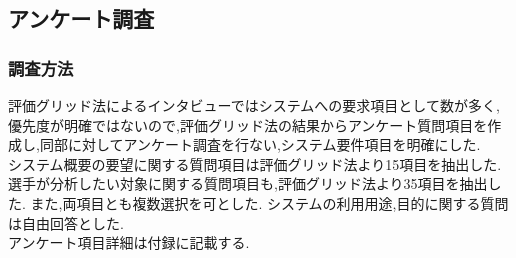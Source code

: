 \documentclass[sotsuron]{kuee}
\begin{document}
		\subsection{アンケート調査}
			\subsubsection{調査方法}
				評価グリッド法によるインタビューではシステムへの要求項目として数が多く,優先度が明確ではないので,評価グリッド法の結果からアンケート質問項目を作成し,同部に対してアンケート調査を行ない,システム要件項目を明確にした.
				\\システム概要の要望に関する質問項目は評価グリッド法より15項目を抽出した.
				選手が分析したい対象に関する質問項目も,評価グリッド法より35項目を抽出した.
				また,両項目とも複数選択を可とした.
				システムの利用用途,目的に関する質問は自由回答とした.
				\\アンケート項目詳細は付録に記載する.
\end{document}
